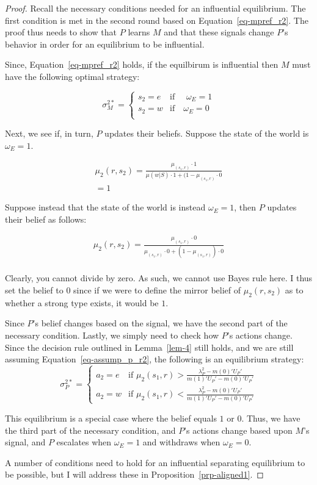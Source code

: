 \documentclass[
  12pt,
]{article}
\theoremstyle{plain}
\theoremstyle{plain}
\theoremstyle{remark}
\begin{document}
\begin{proof}
Recall the necessary conditions needed for an influential equilibrium.
The first condition is met in the second round based on
Equation~\ref{eq-mpref_r2}. The proof thus needs to show that \(P\)
learns \(M\) and that these signals change \(P\)'s behavior in order for
an equilibrium to be influential.

Since, Equation~\ref{eq-mpref_r2} holds, if the equilbirum is
influential then \(M\) must have the following optimal strategy:

\[
\sigma_M^{2*} = 
\begin{cases} 
s_2 =  e & \text{if } \quad \omega_E=1 \\
s_2 = w & \text{if} \quad \omega_E= 0\\
\end{cases}
\]

Next, we see if, in turn, \(P\) updates their beliefs. Suppose the state
of the world is \(\omega_E = 1\).

\[
\begin{aligned}
\mu_2(r, s_2) = \frac{\mu_(s_1, r) \cdot 1}{\mu(w|S) \cdot 1 + (1 - \mu_(s_1, r) \cdot 0}\\
= 1
\end{aligned}
\]

Suppose instead that the state of the world is instead \(\omega_E = 1\),
then \(P\) updates their belief as follows:

\[
\begin{aligned}
\mu_2(r, s_2) = \frac{\mu_(s_1, r) \cdot 0}{\mu_(s_1, r)\cdot 0 + (1 - \mu_(s_1, r)) \cdot 0}\\
\end{aligned}
\]

Clearly, you cannot divide by zero. As such, we cannot use Bayes rule
here. I thus set the belief to \(0\) since if we were to define the
mirror belief of \(\mu_2(r, s_2)\) as to whether a strong type exists,
it would be \(1\).

Since \(P\)'s belief changes based on the signal, we have the second
part of the necessary condition. Lastly, we simply need to check how
\(P\)'s actions change. Since the decision rule outlined in
Lemma~\ref{lem-4} still holds, and we are still assuming
Equation~\ref{eq-assump_p_r2}, the following is an equilibrium strategy:
\[
\sigma_P^{2*} = 
\begin{cases} 
a_2 = e & \text{if } \mu_2(s_1, r) > \frac{\lambda^2_P - m(0)' U_P '}{m(1)' U_P' - m(0)' U_P'}\\
a_2 = w & \text{if } \mu_2(s_1, r) < \frac{\lambda^2_P - m(0)' U_P '}{m(1)' U_P' - m(0)' U_P'}
\end{cases}
\]

This equilibrium is a special case where the belief equals \(1\) or
\(0\). Thus, we have the third part of the necessary condition, and
\(P\)'s actions change based upon \(M\)'s signal, and \(P\) escalates
when \(\omega_E=1\) and withdraws when \(\omega_E=0\).

A number of conditions need to hold for an influential separating
equilibrium to be possible, but I will address these in
Proposition~\ref{prp-aligned1}.
\end{proof}
\end{document}

